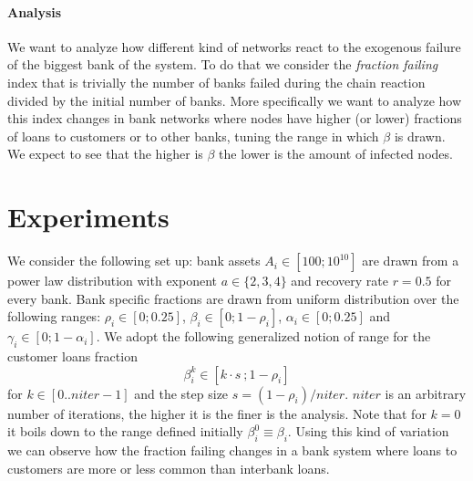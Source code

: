 \documentclass[a4paper, 11pt]{article}
\begin{document}
\paragraph{Analysis}

We want to analyze how different kind of networks react to the exogenous failure of the biggest bank of the system. To do that we consider the \emph{fraction failing} index that is trivially the number of banks failed during the chain reaction divided by the initial number of banks. More specifically we want to analyze how this index changes in bank networks where nodes have higher (or lower) fractions of loans to customers or to other banks, tuning the range in which $\beta$ is drawn. We expect to see that the higher is $\beta$ the lower is the amount of infected nodes.


\section{Experiments} %
\label{sec:experiments}

We consider the following set up: bank assets $A_i \in [100;10^{10}]$ are drawn from a power law distribution with exponent $a \in \{2,3,4\}$ and recovery rate $r = 0.5$ for every bank. Bank specific fractions are drawn from uniform distribution over the following ranges: $\rho_i \in [0;0.25]$, $\beta_i \in [0;1-\rho_i]$, $\alpha_i \in [0;0.25]$ and $\gamma_i \in [0;1-\alpha_i]$. We adopt the following generalized notion of range for the customer loans fraction 
$$\beta_i^k \in \left[ k \cdot s\ ; 1-\rho_i \right]$$
for $k \in [0..niter-1]$ and the step size $s = (1-\rho_i) / niter$. $niter$ is an arbitrary number of iterations, the higher it is the finer is the analysis. Note that for $k = 0$ it boils down to the range defined initially $\beta_i^0 \equiv \beta_i$. Using this kind of variation we can observe how the fraction failing changes in a bank system where loans to customers are more or less common than interbank loans.
\end{document}
